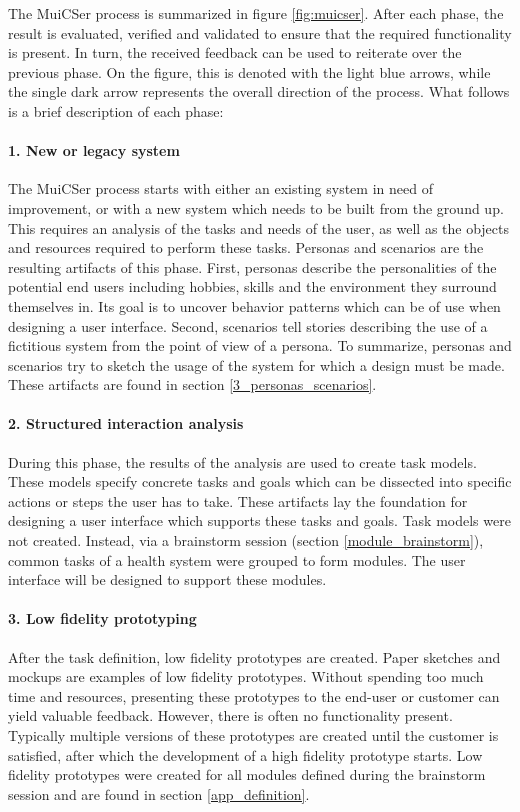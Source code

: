         The MuiCSer process is summarized in figure \ref{fig:muicser}. After each phase, the result is evaluated, verified and validated to ensure that the required functionality is present. In turn, the received feedback can be used to reiterate over the previous phase. On the figure, this is denoted with the light blue arrows, while the single dark arrow represents the overall direction of the process. What follows is a brief description of each phase: %

        \paragraph{1. New or legacy system} The MuiCSer process starts with either an existing system in need of improvement, or with a new system which needs to be built from the ground up. This requires an analysis of the tasks and needs of the user, as well as the objects and resources required to perform these tasks. Personas and scenarios are the resulting artifacts of this phase. First, personas describe the personalities of the potential end users including hobbies, skills and the environment they surround themselves in\cite{persona_scenario}. Its goal is to uncover behavior patterns which can be of use when designing a user interface. Second, scenarios tell stories describing the use of a fictitious system from the point of view of a persona\cite{persona_scenario}. To summarize, personas and scenarios try to sketch the usage of the system for which a design must be made. These artifacts are found in section \ref{3_personas_scenarios}. %

        \paragraph{2. Structured interaction analysis} During this phase, the results of the analysis are used to create task models. These models specify concrete tasks and goals which can be dissected into specific actions or steps the user has to take. These artifacts lay the foundation for designing a user interface which supports these tasks and goals. Task models were not created. Instead, via a brainstorm session (section \ref{module_brainstorm}), common tasks of a health system were grouped to form modules. The user interface will be designed to support these modules. %

        \paragraph{3. Low fidelity prototyping} After the task definition, low fidelity prototypes are created. Paper sketches and mockups are examples of low fidelity prototypes. Without spending too much time and resources, presenting these prototypes to the end-user or customer can yield valuable feedback. However, there is often no functionality present. Typically multiple versions of these prototypes are created until the customer is satisfied, after which the development of a high fidelity prototype starts. Low fidelity prototypes were created for all modules defined during the brainstorm session and are found in section \ref{app_definition}. %

